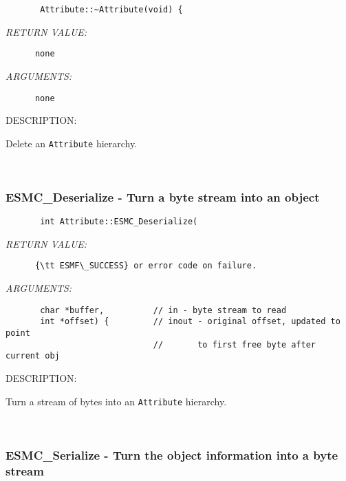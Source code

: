   
\begin{verbatim}       Attribute::~Attribute(void) {\end{verbatim}{\em RETURN VALUE:}
\begin{verbatim}      none\end{verbatim}{\em ARGUMENTS:}
\begin{verbatim}      none\end{verbatim}
{\sf DESCRIPTION:\\ }


      Delete an {\tt Attribute} hierarchy.
   
 
\mbox{}\hrulefill\
 
\subsubsection [ESMC\_Deserialize] {ESMC\_Deserialize - Turn a byte stream into an object}


  
\begin{verbatim}       int Attribute::ESMC_Deserialize(\end{verbatim}{\em RETURN VALUE:}
\begin{verbatim}      {\tt ESMF\_SUCCESS} or error code on failure.\end{verbatim}{\em ARGUMENTS:}
\begin{verbatim}       char *buffer,          // in - byte stream to read
       int *offset) {         // inout - original offset, updated to point 
                              //       to first free byte after current obj\end{verbatim}
{\sf DESCRIPTION:\\ }


      Turn a stream of bytes into an {\tt Attribute} hierarchy.
   
 
\mbox{}\hrulefill\
 
\subsubsection [ESMC\_Serialize] {ESMC\_Serialize - Turn the object information into a byte stream}


